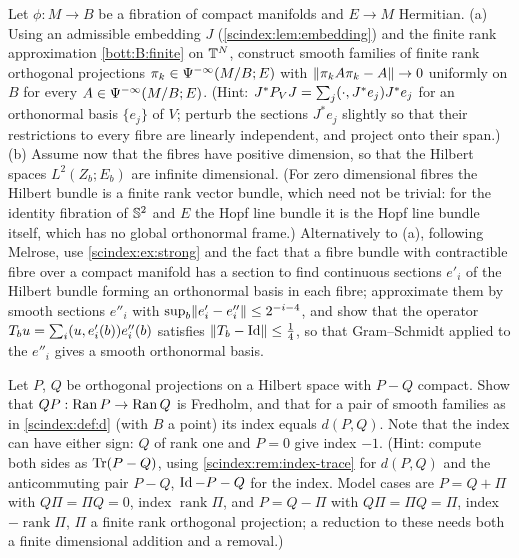 \begin{exercise}\label{scindex:ex:frame}
  Let $\phi:M\to B$ be a fibration of compact manifolds and $E\to M$ Hermitian.
  (a) Using an admissible embedding $J$ (\cref{scindex:lem:embedding}) and
  the finite rank approximation \ref{bott:B:finite} on $\mathbb{T}^N$, construct smooth
  families of finite rank orthogonal projections $\pi_k\in\Psi^{-\infty}(M/B;E)$
  with $\lVert \pi_kA\pi_k-A\rVert\to0$ uniformly on $B$ for every
  $A\in\Psi^{-\infty}(M/B;E)$. (Hint: $J^*P_VJ=\sum_j( \cdot, J^*e_j)J^*e_j$
  for an orthonormal basis $\{e_j\}$ of $V$; perturb the sections $J^*e_j$ slightly
  so that their restrictions to every fibre are linearly independent, and project
  onto their span.)
  (b) Assume now that the fibres have positive dimension, so that the Hilbert
  spaces $L^2(Z_b;E_b)$ are infinite dimensional. (For zero dimensional fibres
  the Hilbert bundle is a finite rank vector bundle, which need not be trivial:
  for the identity fibration of $\mathbb{S}^2$ and $E$ the Hopf line bundle it is
  the Hopf line bundle itself, which has no global orthonormal frame.)
  Alternatively to (a), following Melrose, use \cref{scindex:ex:strong} and the fact
  that a fibre bundle with contractible fibre over a compact manifold has a
  section to find continuous sections $e'_i$ of the Hilbert bundle forming an
  orthonormal basis in each fibre; approximate them by smooth sections $e''_i$ with
  $\sup_b\lVert e'_i-e''_i\rVert\le2^{-i-4}$, and show that the operator
  $T_bu=\sum_i( u, e'_i(b))e''_i(b)$ satisfies $\lVert T_b-\operatorname{Id}\rVert\le\frac14$, so
  that Gram--Schmidt applied to the $e''_i$ gives a smooth orthonormal basis.
\end{exercise}

\begin{exercise}\label{scindex:ex:relative}
  Let $P$, $Q$ be orthogonal projections on a Hilbert space with $P-Q$ compact.
  Show that $QP:\operatorname{Ran} P\to\operatorname{Ran} Q$ is Fredholm, and that for a pair of smooth
  families as in \cref{scindex:def:d} (with $B$ a point) its index equals
  $d(P,Q)$. Note that the index can have either sign: $Q$ of rank one and
  $P=0$ give index $-1$. (Hint: compute both sides as $\operatorname{Tr}(P-Q)$, using
  \cref{scindex:rem:index-trace} for $d(P,Q)$ and the anticommuting pair
  $P-Q$, $\operatorname{Id}-P-Q$ for the index. Model cases are $P=Q+\Pi$ with $Q\Pi=\Pi Q=0$,
  index $\operatorname{rank}\Pi$, and $P=Q-\Pi$ with $Q\Pi=\Pi Q=\Pi$, index
  $-\operatorname{rank}\Pi$, $\Pi$ a finite rank orthogonal projection; a reduction
  to these needs both a finite dimensional addition and a removal.)
\end{exercise}

